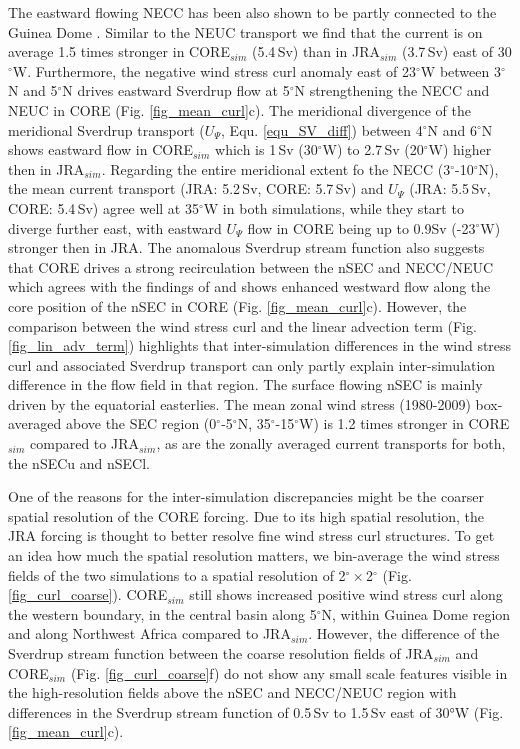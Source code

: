 \documentclass[os, manuscript]{copernicus}
\begin{document}
The eastward flowing NECC has been also shown to be partly connected to the Guinea Dome \citep{Stramma2005,Hormann2012,Stramma2016}. Similar to the NEUC transport we find that the current is on average 1.5 times stronger in CORE$_{sim}$ (5.4$ \, $Sv) than in JRA$_{sim}$  (3.7$ \, $Sv) east of 30$^{\circ}$W. Furthermore, the negative wind stress curl anomaly east of 23$^{\circ}$W between 3$^{\circ}$N and 5$^{\circ}$N drives eastward Sverdrup flow at 5$^{\circ}$N strengthening the NECC and NEUC in CORE (Fig. \ref{fig_mean_curl}c). The meridional divergence of the meridional Sverdrup transport ($ U_{\Psi} $, Equ. \ref{equ_SV_diff}) between 4$^{\circ}$N and 6$^{\circ}$N shows eastward flow in CORE$_{sim}$ which is 1$\,$Sv (30$^{\circ}$W) to 2.7$\,$Sv (20$^{\circ}$W) higher then in JRA$_{sim}$. Regarding the entire meridional extent fo the NECC (3$^{\circ}$-10$^{\circ}$N), the mean current transport (JRA: 5.2$\,$Sv, CORE: 5.7$\,$Sv) and $ U_{\Psi} $ (JRA: 5.5$\,$Sv, CORE: 5.4$\,$Sv) agree well at 35$^{\circ}$W in both simulations, while they start to diverge further east, with eastward $ U_{\Psi} $ flow in CORE being up to 0.9Sv (-23$^{\circ}$W) stronger then in JRA. The anomalous Sverdrup stream function also suggests that CORE drives a strong recirculation between the nSEC and NECC/NEUC which agrees with the findings of \cite{Burmeister2019} and shows enhanced westward flow along the core position of the nSEC in CORE (Fig. \ref{fig_mean_curl}c). However, the comparison between the wind stress curl and the linear advection term (Fig.\ref{fig_lin_adv_term}) highlights that inter-simulation differences in the wind stress curl and associated Sverdrup transport can only partly explain inter-simulation difference in the flow field in that region. The surface flowing nSEC is mainly driven by the equatorial easterlies. The mean zonal wind stress (1980-2009) box-averaged above the SEC region (0$^{\circ}$-5$^{\circ}$N, 35$^{\circ}$-15$^{\circ}$W) is 1.2 times stronger in CORE$_{sim}$ compared to JRA$_{sim}$, as are the zonally averaged current transports for both, the nSECu and nSECl.

One of the reasons for the inter-simulation discrepancies might be the coarser spatial resolution of the CORE forcing. Due to its high spatial resolution, the JRA forcing is thought to better resolve fine wind stress curl structures. To get an idea how much the spatial resolution matters, we bin-average the wind stress fields of the two simulations to a spatial resolution of 2$^{\circ} \times$2$^{\circ}$ (Fig. \ref{fig_curl_coarse}). CORE$_{sim}$ still shows increased positive wind stress curl along the western boundary, in the central basin along 5$^{\circ}$N, within Guinea Dome region and along Northwest Africa compared to JRA$_{sim}$. However, the difference of the Sverdrup stream function between the coarse resolution fields of JRA$_{sim}$ and CORE$_{sim}$ (Fig. \ref{fig_curl_coarse}f) do not show any small scale features visible in the high-resolution fields above the nSEC and NECC/NEUC region with differences in the Sverdrup stream function of 0.5$\,$Sv to 1.5$\,$Sv east of 30°W (Fig.\ref{fig_mean_curl}c).
\end{document}

